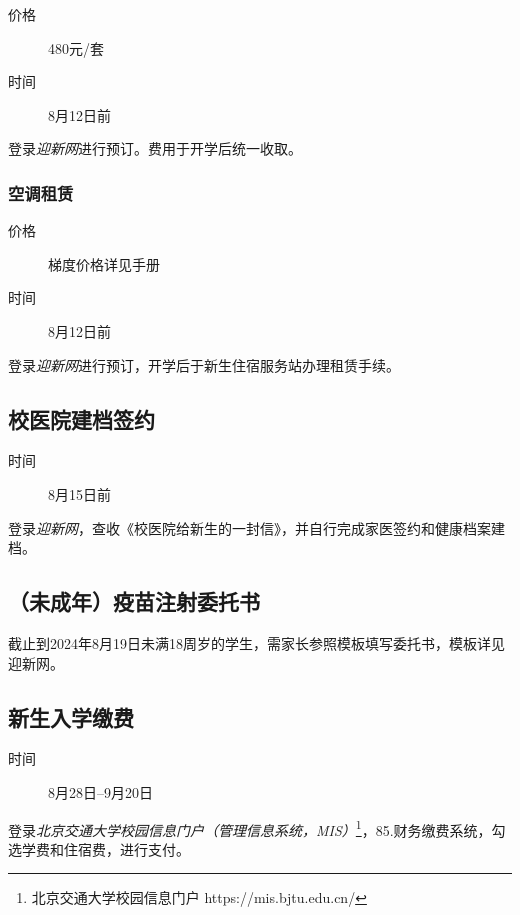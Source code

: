 \documentclass[a4paper]{ctexart}
\begin{document}
\begin{description}
	\item[价格] 480元/套
	\item[时间] 8月12日前
\end{description}

登录\textit{迎新网}进行预订。费用于开学后统一收取。

\subsubsection{空调租赁}

\begin{description}
	\item[价格] 梯度价格详见手册
	\item[时间] 8月12日前
\end{description}

登录\textit{迎新网}进行预订，开学后于新生住宿服务站办理租赁手续。

\subsection{校医院建档签约}

\begin{description}
	\item[时间] 8月15日前
\end{description}

登录\textit{迎新网}，查收《校医院给新生的一封信》，并自行完成家医签约和健康档案建档。

\subsection{（未成年）疫苗注射委托书}

截止到2024年8月19日未满18周岁的学生，需家长参照模板填写委托书，模板详见迎新网。

\subsection{新生入学缴费}

\begin{description}
	\item[时间] 8月28日--9月20日
\end{description}


登录\textit{北京交通大学校园信息门户（管理信息系统，MIS）}\footnote{北京交通大学校园信息门户 https://mis.bjtu.edu.cn/}，85.财务缴费系统，勾选学费和住宿费，进行支付。
\end{document}
